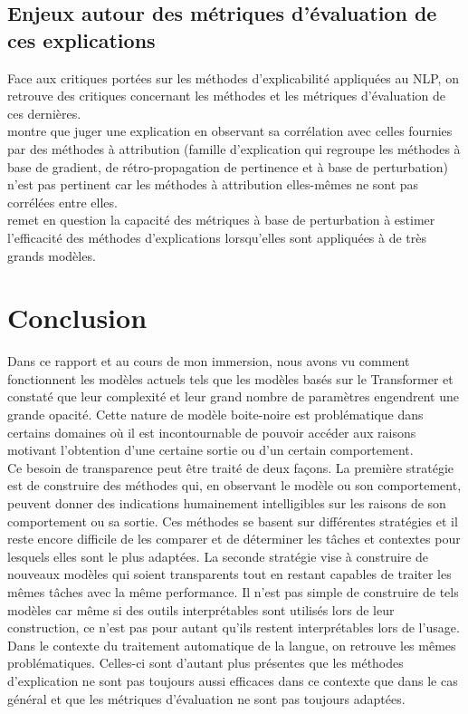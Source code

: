 \documentclass{report}
\begin{document}
    \section{Enjeux autour des métriques d'évaluation de ces explications}
        Face aux critiques portées sur les méthodes d'explicabilité appliquées au NLP, on retrouve des critiques concernant les méthodes et les métriques d'évaluation de ces dernières.\\
        \cite{neely_song_2022} montre que juger une explication en observant sa corrélation avec celles fournies par des méthodes à attribution (famille d'explication qui regroupe les méthodes à base de gradient, de rétro-propagation de pertinence et à base de perturbation) n'est pas pertinent car les méthodes à attribution elles-mêmes ne sont pas corrélées entre elles.\\
        \cite{mersha_evaluating_2025} remet en question la capacité des métriques à base de perturbation à estimer l'efficacité des méthodes d'explications lorsqu'elles sont appliquées à de très grands modèles.
        
\chapter{Conclusion}
    
    Dans ce rapport et au cours de mon immersion, nous avons vu comment fonctionnent les modèles actuels tels que les modèles basés sur le Transformer et constaté que leur complexité et leur grand nombre de paramètres engendrent une grande opacité. Cette nature de modèle boite-noire est problématique dans certains domaines où il est incontournable de pouvoir accéder aux raisons motivant l'obtention d'une certaine sortie ou d'un certain comportement. \\
    Ce besoin de transparence peut être traité de deux façons. La première stratégie est de construire des méthodes qui, en observant le modèle ou son comportement, peuvent donner des indications humainement intelligibles sur les raisons de son comportement ou sa sortie. Ces méthodes se basent sur différentes stratégies et il reste encore difficile de les comparer et de déterminer les tâches et contextes pour lesquels elles sont le plus adaptées. La seconde stratégie vise à construire de nouveaux modèles qui soient transparents tout en restant capables de traiter les mêmes tâches avec la même performance. Il n'est pas simple de construire de tels modèles car même si des outils interprétables sont utilisés lors de leur construction, ce n'est pas pour autant qu'ils restent interprétables lors de l'usage.\\
    Dans le contexte du traitement automatique de la langue, on retrouve les mêmes problématiques. Celles-ci sont d'autant plus présentes que les méthodes d'explication ne sont pas toujours aussi efficaces dans ce contexte que dans le cas général et que les métriques d'évaluation ne sont pas toujours adaptées.
    
\end{document}
